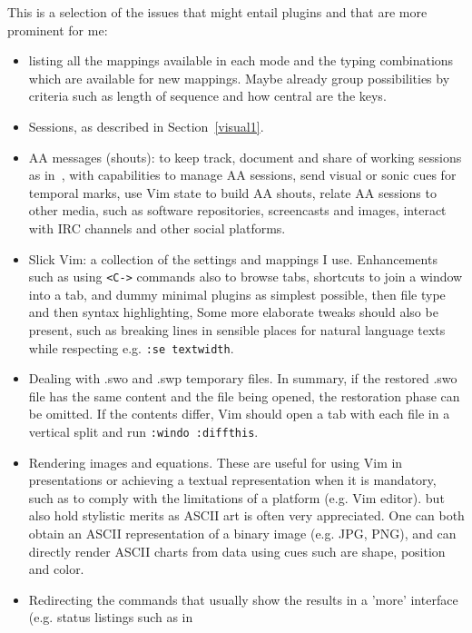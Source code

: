 \documentclass{article}
\newcommand{\ttt}[1] {
	\texttt{<#1>}}
\newcommand{\tttt}[1]{\texttt{#1}}
\begin{document}
\noindent This is a selection of the issues that might entail
plugins and that are more prominent for me:
    \begin{itemize}
      \item listing all the mappings available in each mode and the typing combinations which are available
        for new mappings.
        Maybe already group possibilities by criteria such as length
        of sequence and how central are the keys.
      \item Sessions, as described in Section~\ref{visual1}.
      \item AA messages (shouts): to keep track, document and share of working sessions
        as in~\cite{aa1,aa2}, with capabilities to manage AA sessions,
        send visual or sonic cues for temporal marks, use Vim state to build AA shouts,
        relate AA sessions to other media, such as software repositories,
        screencasts and images, interact with IRC channels and other social platforms.
      \item Slick Vim: a collection of the settings and mappings I use.
        Enhancements such as using \ttt{C-} commands also to browse tabs,
        shortcuts to join a window into a tab,
        and dummy minimal plugins as simplest possible, then file type
        and then syntax highlighting,
        Some more elaborate tweaks should also be present, such
        as breaking lines in sensible places for natural language texts
        while respecting e.g. \tttt{:se textwidth}.
      \item Dealing with .swo and .swp temporary files.
        In summary, if the restored .swo file has the same content
        and the file being opened,
        the restoration phase can be omitted.
        If the contents differ, Vim should open a tab with each file
        in a vertical split and run \tttt{:windo :diffthis}.
      \item Rendering images and equations.
        These are useful for using Vim in presentations
        or achieving a textual representation when it is mandatory,
        such as to comply with the limitations of a platform (e.g. Vim editor). 
        but also hold stylistic merits as ASCII art is often
        very appreciated.
        One can both obtain an ASCII representation of a binary image (e.g. JPG, PNG),
        and can directly render ASCII charts from data using cues such are shape, position
        and color.
      \item Redirecting the commands that usually show the results in
        a 'more' interface (e.g. status listings such as in

\end{itemize}
\end{document}
